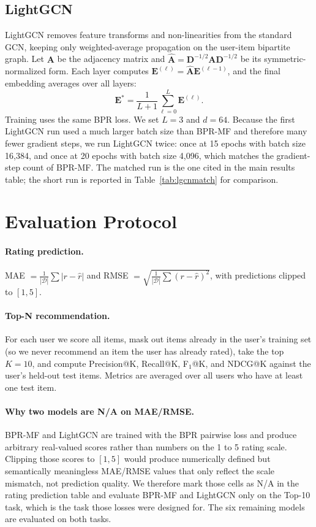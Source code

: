 \documentclass[sigconf,nonacm]{acmart}
\begin{document}
\subsection{LightGCN}
LightGCN removes feature transforms and non-linearities from the standard
GCN, keeping only weighted-average propagation on the user-item bipartite
graph. Let $\mathbf{A}$ be the adjacency matrix and
$\hat{\mathbf{A}} = \mathbf{D}^{-1/2} \mathbf{A} \mathbf{D}^{-1/2}$ be its
symmetric-normalized form. Each layer computes
$\mathbf{E}^{(\ell)} = \hat{\mathbf{A}} \mathbf{E}^{(\ell-1)}$, and the
final embedding averages over all layers:
\begin{equation}
\mathbf{E}^{*} = \frac{1}{L+1} \sum_{\ell=0}^{L} \mathbf{E}^{(\ell)}.
\end{equation}
Training uses the same BPR loss. We set $L = 3$ and $d = 64$. Because the
first LightGCN run used a much larger batch size than BPR-MF and therefore
many fewer gradient steps, we run LightGCN twice: once at 15 epochs with
batch size 16{,}384, and once at 20 epochs with batch size 4{,}096, which
matches the gradient-step count of BPR-MF. The matched run is the one
cited in the main results table; the short run is reported in
Table~\ref{tab:lgcnmatch} for comparison.

\section{Evaluation Protocol}
\paragraph{Rating prediction.} MAE $= \frac{1}{|\mathcal{D}|}\sum |r - \hat{r}|$
and RMSE $= \sqrt{\frac{1}{|\mathcal{D}|}\sum (r - \hat{r})^2}$, with
predictions clipped to $[1, 5]$.

\paragraph{Top-N recommendation.} For each user we score all items, mask
out items already in the user's training set (so we never recommend an
item the user has already rated), take the top $K = 10$, and compute
Precision@K, Recall@K, F$_1$@K, and NDCG@K against the user's held-out
test items. Metrics are averaged over all users who have at least one
test item.

\paragraph{Why two models are N/A on MAE/RMSE.} BPR-MF and LightGCN are
trained with the BPR pairwise loss and produce arbitrary real-valued
scores rather than numbers on the 1 to 5 rating scale. Clipping those
scores to $[1,5]$ would produce numerically defined but semantically
meaningless MAE/RMSE values that only reflect the scale mismatch, not
prediction quality. We therefore mark those cells as N/A in the rating
prediction table and evaluate BPR-MF and LightGCN only on the Top-10
task, which is the task those losses were designed for. The six
remaining models are evaluated on both tasks.
\end{document}

